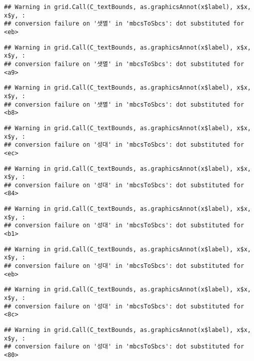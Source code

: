 \documentclass[
]{article}
\begin{document}
\begin{verbatim}
## Warning in grid.Call(C_textBounds, as.graphicsAnnot(x$label), x$x, x$y, :
## conversion failure on '샛멸' in 'mbcsToSbcs': dot substituted for <eb>
\end{verbatim}

\begin{verbatim}
## Warning in grid.Call(C_textBounds, as.graphicsAnnot(x$label), x$x, x$y, :
## conversion failure on '샛멸' in 'mbcsToSbcs': dot substituted for <a9>
\end{verbatim}

\begin{verbatim}
## Warning in grid.Call(C_textBounds, as.graphicsAnnot(x$label), x$x, x$y, :
## conversion failure on '샛멸' in 'mbcsToSbcs': dot substituted for <b8>
\end{verbatim}

\begin{verbatim}
## Warning in grid.Call(C_textBounds, as.graphicsAnnot(x$label), x$x, x$y, :
## conversion failure on '성대' in 'mbcsToSbcs': dot substituted for <ec>
\end{verbatim}

\begin{verbatim}
## Warning in grid.Call(C_textBounds, as.graphicsAnnot(x$label), x$x, x$y, :
## conversion failure on '성대' in 'mbcsToSbcs': dot substituted for <84>
\end{verbatim}

\begin{verbatim}
## Warning in grid.Call(C_textBounds, as.graphicsAnnot(x$label), x$x, x$y, :
## conversion failure on '성대' in 'mbcsToSbcs': dot substituted for <b1>
\end{verbatim}

\begin{verbatim}
## Warning in grid.Call(C_textBounds, as.graphicsAnnot(x$label), x$x, x$y, :
## conversion failure on '성대' in 'mbcsToSbcs': dot substituted for <eb>
\end{verbatim}

\begin{verbatim}
## Warning in grid.Call(C_textBounds, as.graphicsAnnot(x$label), x$x, x$y, :
## conversion failure on '성대' in 'mbcsToSbcs': dot substituted for <8c>
\end{verbatim}

\begin{verbatim}
## Warning in grid.Call(C_textBounds, as.graphicsAnnot(x$label), x$x, x$y, :
## conversion failure on '성대' in 'mbcsToSbcs': dot substituted for <80>
\end{verbatim}
\end{document}
